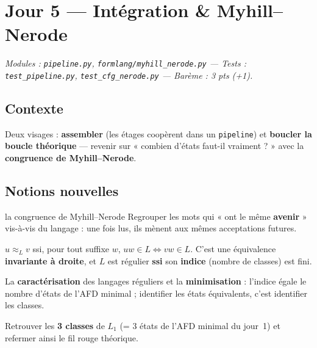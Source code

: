 \documentclass[11pt,a4paper]{scrartcl}
\begin{document}
\section{Jour 5 — Intégration \& Myhill--Nerode}
\emph{Modules : \texttt{pipeline.py}, \texttt{formlang/myhill\_nerode.py} — Tests :
\texttt{test\_pipeline.py}, \texttt{test\_cfg\_nerode.py} — Barème : 3 pts (+1).}

\subsection{Contexte}
Deux visages : \textbf{assembler} (les étages coopèrent dans un \texttt{pipeline}) et
\textbf{boucler la boucle théorique} — revenir sur « combien d'états faut-il vraiment ? »
avec la \textbf{congruence de Myhill--Nerode}.

\subsection{Notions nouvelles}
\begin{objetformel}{la congruence de Myhill--Nerode}
 Regrouper les mots qui « ont le même \textbf{avenir} » vis-à-vis du
langage : une fois lus, ils mènent aux mêmes acceptations futures.

 $u\approx_{L}v$ ssi, pour tout suffixe $w$,
$uw\in L\Leftrightarrow vw\in L$. C'est une équivalence \textbf{invariante à droite}, et
$L$ est régulier \textbf{ssi} son \textbf{indice} (nombre de classes) est fini.

 La \textbf{caractérisation} des langages réguliers et la
\textbf{minimisation} : l'indice égale le nombre d'états de l'AFD minimal ; identifier les
états équivalents, c'est identifier les classes.

 Retrouver les \textbf{3 classes} de $L_1$ (= 3 états de l'AFD minimal
du jour~1) et refermer ainsi le fil rouge théorique.
\end{objetformel}
\end{document}
